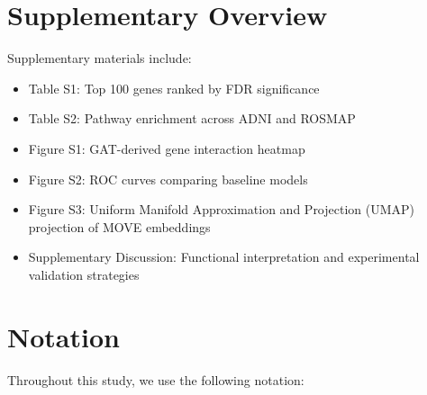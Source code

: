 \documentclass[12pt]{article}
\begin{document}
\section*{Supplementary Overview}
Supplementary materials include:
\begin{itemize}
  \item Table S1: Top 100 genes ranked by FDR significance
  \item Table S2: Pathway enrichment across ADNI and ROSMAP
  \item Figure S1: GAT-derived gene interaction heatmap
  \item Figure S2: ROC curves comparing baseline models
  \item Figure S3: Uniform Manifold Approximation and Projection (UMAP) projection of MOVE embeddings
  \item Supplementary Discussion: Functional interpretation and experimental validation strategies
\end{itemize}

\section*{Notation}

Throughout this study, we use the following notation:
\end{document}
